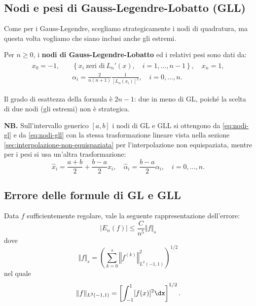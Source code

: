 \subsection{Nodi e pesi di Gauss-Legendre-Lobatto (GLL)}
Come per i Gauss-Legendre, scegliamo strategicamente i nodi di quadratura, ma questa volta vogliamo che siano inclusi anche gli estremi.

Per $n\geqslant 0$, i \textbf{nodi di Gauss-Legendre-Lobatto} ed i relativi pesi sono dati da:
\begin{gather}
\begin{split}
x_{0} =-1,\quad &\left\{x_{i} \ \text{zeri di} \ L_{n} '(x) ,\quad i=1,\dotsc ,n-1\right\} ,\quad x_{n} =1,\\
&\alpha _{i} =\frac{2}{n( n+1)}\frac{1}{[ L_{n}( x_{i})]^{2}} ,\quad i=0,\dotsc ,n.
\end{split}
\label{eq:nodi-gll}
\end{gather}

Il grado di esattezza della formula è $2n-1$: due in meno di GL, poiché la scelta di due nodi (gli estremi) non è strategica.

\textbf{NB.}
Sull'intervallo generico $[ a,b]$ i nodi di GL e GLL si ottengono da \eqref{eq:nodi-gl} e da \eqref{eq:nodi-gll} con la stessa trasformazione lineare vista nella sezione \ref{sec:interpolazione-non-equispaziata} per l'interpolazione non equispaziata, mentre per i pesi si usa un'altra trasformazione:
\begin{equation*}
\hat{x}_{i} =\frac{a+b}{2} +\frac{b-a}{2} x_{i}, \quad \hat \alpha_i=\frac{b-a}{2}\alpha_i,\quad i=0,\dotsc ,n.
\end{equation*}

\subsection{Errore delle formule di GL e GLL}
Data $f$ sufficientemente regolare, vale la seguente rappresentazione dell'errore:
\begin{equation*}
| E_{n}(f)| \leqslant \frac{C}{n^{5}}\Vert f\Vert _{s}
\end{equation*}
dove
\begin{equation*}
\Vert f\Vert _{s} =\left(\sum\limits ^{s}_{k=0}\left\Vert f^{(k)}\right\Vert ^{2}_{L^{2}( -1,1)}\right)^{1/2}
\end{equation*}
nel quale
\begin{equation*}
\Vert f\Vert _{L^{2}( -1,1)} =\left[\int\nolimits ^{1}_{-1}[ f(x)]^{2} \dx\right]^{1/2} .
\end{equation*}

